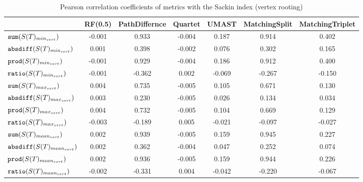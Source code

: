 \begin{table}[h]
\centering
\caption{Pearson correlation coefficients of metrics with the Sackin index (vertex rooting)}
\begin{tabular}{lcccccc}
 & RF(0.5) & PathDiffernce & Quartet & UMAST & MatchingSplit & MatchingTriplet \\
\hline
${\verb+sum+}(S(T)_{min_{vert}})$ & -0.001 & 0.933 & -0.004 & 0.187 & 0.914 & 0.402 \\
${\verb+absdiff+}(S(T)_{min_{vert}})$ & 0.001 & 0.398 & -0.002 & 0.076 & 0.302 & 0.165 \\
${\verb+prod+}(S(T)_{min_{vert}})$ & -0.001 & 0.929 & -0.004 & 0.186 & 0.912 & 0.400 \\
${\verb+ratio+}(S(T)_{min_{vert}})$ & -0.001 & -0.362 & 0.002 & -0.069 & -0.267 & -0.150 \\
${\verb+sum+}(S(T)_{max_{vert}})$ & 0.004 & 0.735 & -0.005 & 0.105 & 0.671 & 0.130 \\
${\verb+absdiff+}(S(T)_{max_{vert}})$ & 0.003 & 0.230 & -0.005 & 0.026 & 0.134 & 0.034 \\
${\verb+prod+}(S(T)_{max_{vert}})$ & 0.004 & 0.732 & -0.005 & 0.104 & 0.669 & 0.129 \\
${\verb+ratio+}(S(T)_{max_{vert}})$ & -0.003 & -0.189 & 0.005 & -0.021 & -0.097 & -0.027 \\
${\verb+sum+}(S(T)_{mean_{vert}})$ & 0.002 & 0.939 & -0.005 & 0.159 & 0.945 & 0.227 \\
${\verb+absdiff+}(S(T)_{mean_{vert}})$ & 0.002 & 0.362 & -0.004 & 0.047 & 0.252 & 0.074 \\
${\verb+prod+}(S(T)_{mean_{vert}})$ & 0.002 & 0.936 & -0.005 & 0.159 & 0.944 & 0.226 \\
${\verb+ratio+}(S(T)_{mean_{vert}})$ & -0.002 & -0.331 & 0.004 & -0.042 & -0.220 & -0.067 \\
\end{tabular}
\end{table}

